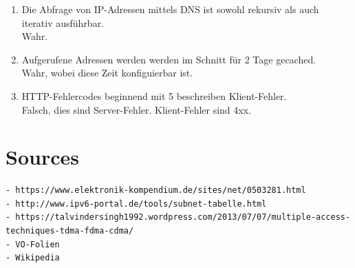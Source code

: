 \documentclass{scrartcl}
\begin{document}
\begin{enumerate}
        \item Die Abfrage von IP-Adressen mittels DNS ist sowohl rekursiv als auch iterativ ausführbar.\\
        Wahr. 
        
        \item Aufgerufene Adressen werden werden im Schnitt für 2 Tage gecached.\\
        Wahr, wobei diese Zeit konfiguierbar ist.
        
        \item HTTP-Fehlercodes beginnend mit 5 beschreiben Klient-Fehler.\\
        Falsch, dies sind Server-Fehler. Klient-Fehler sind 4xx.
        \end{enumerate}
        
\section{Sources}
    \begin{verbatim}
- https://www.elektronik-kompendium.de/sites/net/0503281.html
- http://www.ipv6-portal.de/tools/subnet-tabelle.html
- https://talvindersingh1992.wordpress.com/2013/07/07/multiple-access-techniques-tdma-fdma-cdma/
- VO-Folien
- Wikipedia
    \end{verbatim}
\end{document}
